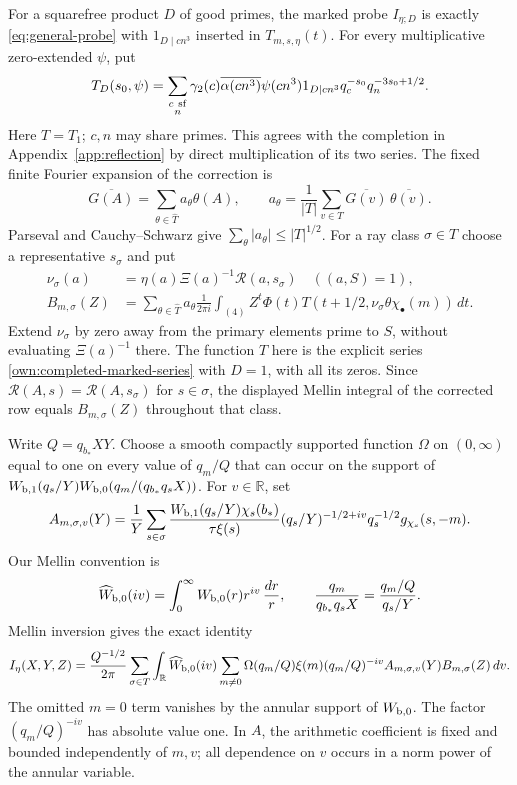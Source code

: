 \documentclass[12pt]{article}
\begin{document}
For a squarefree product \(D\) of good primes, the marked probe
\(I_{\eta;D}\) is exactly \eqref{eq:general-probe} with
\(1_{D\mid cn^3}\) inserted in \(T_{m,s,\eta}(t)\).
For every multiplicative zero-extended \(\psi\), put
\begin{equation}\label{own:completed-marked-series}
 T_D(s_0,\psi)=\sum_{\substack{c\ {\rm sf}\\n}}
 \gamma_2(c)\overline{\alpha(cn^3)}\psi(cn^3)
 1_{D\mid cn^3}q_c^{-s_0}q_n^{-3s_0+1/2}.
\end{equation}
Here \(T=T_1\); \(c,n\) may share primes.  This agrees with the
completion in Appendix~\ref{app:reflection} by direct multiplication
of its two series.
The fixed finite Fourier expansion of the correction is
\[
 \overline{G(A)}=\sum_{\theta\in\widehat T}a_\theta\theta(A),
 \qquad
 a_\theta=\frac1{|T|}\sum_{v\in T}
                 \overline{G(v)}\,\overline{\theta(v)}.
\]
Parseval and Cauchy--Schwarz give
$\sum_\theta|a_\theta|\le |T|^{1/2}$.  For a ray class
$\sigma\in T$ choose a representative $s_\sigma$ and put
\[
 \begin{aligned}
 \nu_\sigma(a)&=\eta(a)\Xi(a)^{-1}\mathcal R(a,s_\sigma)
       \quad ((a,S)=1),\\
 B_{m,\sigma}(Z)&=\sum_{\theta\in\widehat T}a_\theta
 \frac1{2\pi i}\int_{(4)}Z^t\Phi(t)
       T(t+1/2,\nu_\sigma\theta\chi_\bullet(m))\,dt.
 \end{aligned}
\]
Extend $\nu_\sigma$ by zero away from the primary elements prime to $S$, without
evaluating $\Xi(a)^{-1}$ there.  The function $T$ here is the explicit series
\eqref{own:completed-marked-series} with $D=1$, with all its zeros.
Since $\mathcal R(A,s)=\mathcal R(A,s_\sigma)$ for $s\in\sigma$,
the displayed Mellin integral of the corrected row equals
$B_{m,\sigma}(Z)$ throughout that class.

Write $Q=q_{b_*}XY$.  Choose a smooth compactly supported function
$\Omega$ on $(0,\infty)$ equal to one on every value of $q_m/Q$
that can occur on the support of
$W_{\rm b,1}(q_s/Y)W_{\rm b,0}(q_m/(q_{b_*}q_sX))$.  For $v\in\mathbb R$, set
\[
 A_{m,\sigma,v}(Y)=\frac1Y\sum_{s\in\sigma}
 \frac{W_{\rm b,1}(q_s/Y)\chi_s(b_*)}{\tau\xi(s)}
 (q_s/Y)^{-1/2+iv}q_s^{-1/2}g_{\chi_s}(s,-m).
\]
Our Mellin convention is
\[
 \widehat W_{\rm b,0}(iv)=\int_0^\infty W_{\rm b,0}(r)r^{iv}\,\frac{dr}{r},
 \qquad
 \frac{q_m}{q_{b_*}q_sX}=\frac{q_m/Q}{q_s/Y}.
\]
Mellin inversion gives the exact identity
\begin{equation}\label{eq:low-separated}
 I_\eta(X,Y,Z)=\frac{Q^{-1/2}}{2\pi}
 \sum_{\sigma\in T}\int_{\mathbb R}\widehat W_{\rm b,0}(iv)
 \sum_{m\ne0}\Omega(q_m/Q)\xi(m)(q_m/Q)^{-iv}
                 A_{m,\sigma,v}(Y)B_{m,\sigma}(Z)\,dv.
\end{equation}
The omitted $m=0$ term vanishes by the annular support of $W_{\rm b,0}$.
The factor $(q_m/Q)^{-iv}$ has absolute value one.  In $A$, the
arithmetic coefficient is fixed and bounded independently of $m,v$;
all dependence on $v$ occurs in a norm power of the annular variable.
\end{document}
